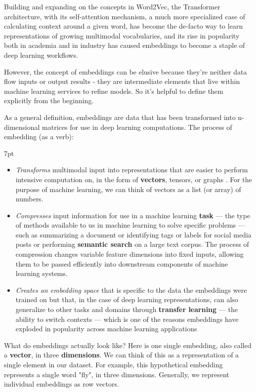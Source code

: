 \documentclass[11pt, table]{diazessay} %
\newenvironment{formal}{%
  \def\FrameCommand{%
	\hspace{1pt}%
	{\color{w_lightblue}\vrule width 2pt}%
	{\color{formalshade}\vrule width 4pt}%
	\colorbox{formalshade}%
  }%
  \MakeFramed{\advance\hsize-\width\FrameRestore}%
  \noindent\hspace{-4.55pt}%
  \begin{adjustwidth}{}{7pt}%
  \vspace{2pt}\vspace{2pt}%
}
{%
  \vspace{2pt}\end{adjustwidth}\endMakeFramed%
}
\begin{document}
\begin{sloppypar}
Building and expanding on the concepts in Word2Vec, the Transformer  \citep{vaswani2017attention} architecture, with its self-attention mechanism, a much more specialized case of calculating context around a given word, has become the de-facto way to learn representations of growing multimodal vocabularies, and its rise in popularity both in academia and in industry has caused embeddings to become a staple of deep learning workflows.

However, the concept of embeddings can be elusive because they're neither data flow inputs or output results - they are intermediate elements that live within machine learning services to refine models. So it's helpful to define them explicitly from the beginning.

As a general definition, embeddings are data that has been transformed into n-dimensional matrices for use in deep learning computations. The process of embedding (as a verb):  
\begin{formal}
\begin{itemize}
   \item \emph{Transforms} multimodal input into representations that are easier to perform intensive computation on, in the form of \textbf{vectors}, tensors, or graphs \citep{rao2019natural}. For the purpose of machine learning, we can think of vectors as a list (or array) of numbers.
  \item \emph{Compresses} input information for use in a machine learning \textbf{task} --- the type of methods available to us in machine learning to solve specific problems --- such as summarizing a document or identifying tags or labels for social media posts or performing \textbf{semantic search} on a large text corpus. The process of compression changes variable feature dimensions into fixed inputs, allowing them to be passed efficiently into downstream components of machine learning systems.
  \item \emph{Creates an embedding space} that is specific to the data the embeddings were trained on but that, in the case of deep learning representations, can also generalize to other tasks and domains through \textbf{transfer learning} --- the ability to switch contexts --- which is one of the reasons embeddings have exploded in popularity across machine learning applications
\end{itemize}
\end{formal}

What do embeddings actually look like? Here is one single embedding, also called a \textbf{vector}, in three \textbf{dimensions}. We can think of this as a representation of a single element in our dataset. For example, this hypothetical embedding represents a single word "fly", in three dimensions.  Generally, we represent individual embeddings as row vectors.


\end{sloppypar}
\end{document}
